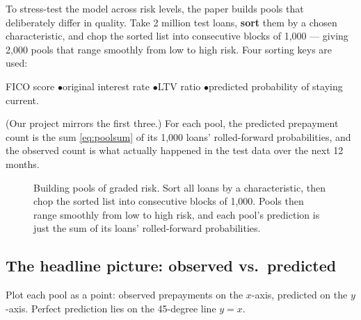 \documentclass[11pt]{article}
\begin{document}
To stress-test the model across risk levels, the paper builds pools that deliberately differ
in quality. Take 2 million test loans, \textbf{sort} them by a chosen characteristic, and
chop the sorted list into consecutive blocks of 1{,}000 --- giving 2{,}000 pools that range
smoothly from low to high risk. Four sorting keys are used:

\begin{center}
FICO score \quad$\bullet$\quad original interest rate \quad$\bullet$\quad LTV ratio
\quad$\bullet$\quad predicted probability of staying current.
\end{center}

(Our project mirrors the first three.) For each pool, the predicted prepayment count is the
sum \eqref{eq:poolsum} of its 1{,}000 loans' rolled-forward probabilities, and the observed
count is what actually happened in the test data over the next 12 months.

\begin{figure}[H]
\centering
{}
\caption{Building pools of graded risk. Sort all loans by a characteristic, then chop the
sorted list into consecutive blocks of 1{,}000. Pools then range smoothly from low to high
risk, and each pool's prediction is just the sum of its loans' rolled-forward probabilities.}
\end{figure}

\subsection{The headline picture: observed vs.\ predicted}

Plot each pool as a point: observed prepayments on the $x$-axis, predicted on the $y$-axis.
Perfect prediction lies on the 45-degree line $y=x$.
\end{document}
